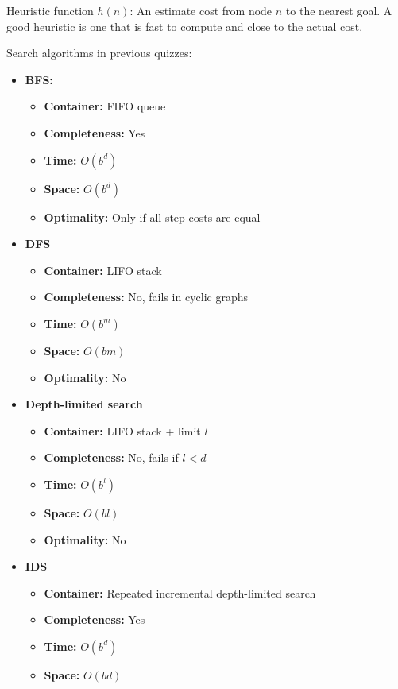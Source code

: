 \documentclass[12pt,a4paper]{article}
\begin{document}
Heuristic function $h(n)$: An estimate cost from node $n$ to the nearest goal. A good heuristic is one that is fast to compute and close to the actual cost.

\newpage
Search algorithms in previous quizzes:
\begin{itemize}
    \item \textbf{BFS:}
    \begin{itemize}
        \item \textbf{Container:} FIFO queue
        \item \textbf{Completeness:} Yes
        \item \textbf{Time:} $O(b^{d})$
        \item \textbf{Space:} $O(b^{d})$
        \item \textbf{Optimality:} Only if all step costs are equal
    \end{itemize}
    \item \textbf{DFS}
    \begin{itemize}
        \item \textbf{Container:} LIFO stack
        \item \textbf{Completeness:} No, fails in cyclic graphs
        \item \textbf{Time:} $O(b^{m})$
        \item \textbf{Space:} $O(bm)$
        \item \textbf{Optimality:} No
    \end{itemize}
    \item \textbf{Depth-limited search}
    \begin{itemize}
        \item \textbf{Container:} LIFO stack + limit $l$
        \item \textbf{Completeness:} No, fails if $l < d$
        \item \textbf{Time:} $O(b^{l})$
        \item \textbf{Space:} $O(bl)$
        \item \textbf{Optimality:} No
    \end{itemize}
    \item \textbf{IDS}
    \begin{itemize}
        \item \textbf{Container:} Repeated incremental depth-limited search
        \item \textbf{Completeness:} Yes
        \item \textbf{Time:} $O(b^{d})$
        \item \textbf{Space:} $O(bd)$

\end{itemize}
\end{itemize}
\end{document}
